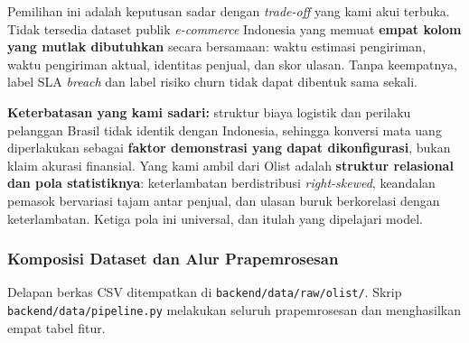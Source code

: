 \documentclass[12pt,a4paper]{article}
\begin{document}
Pemilihan ini adalah keputusan sadar dengan \textit{trade-off} yang kami akui terbuka. Tidak tersedia dataset publik \textit{e-commerce} Indonesia yang memuat \textbf{empat kolom yang mutlak dibutuhkan} secara bersamaan: waktu estimasi pengiriman, waktu pengiriman aktual, identitas penjual, dan skor ulasan. Tanpa keempatnya, label SLA \textit{breach} dan label risiko churn tidak dapat dibentuk sama sekali.

\textbf{Keterbatasan yang kami sadari:} struktur biaya logistik dan perilaku pelanggan Brasil tidak identik dengan Indonesia, sehingga konversi mata uang diperlakukan sebagai \textbf{faktor demonstrasi yang dapat dikonfigurasi}, bukan klaim akurasi finansial. Yang kami ambil dari Olist adalah \textbf{struktur relasional dan pola statistiknya}: keterlambatan berdistribusi \textit{right-skewed}, keandalan pemasok bervariasi tajam antar penjual, dan ulasan buruk berkorelasi dengan keterlambatan. Ketiga pola ini universal, dan itulah yang dipelajari model.

\subsubsection{Komposisi Dataset dan Alur Prapemrosesan}

Delapan berkas CSV ditempatkan di \texttt{backend/data/raw/olist/}. Skrip \texttt{backend/data/pipe\-line.py} melakukan seluruh prapemrosesan dan menghasilkan empat tabel fitur.
\end{document}
